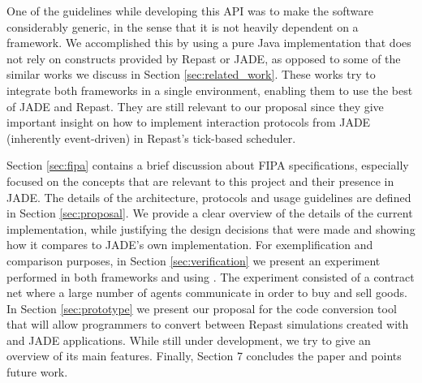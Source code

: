 One of the guidelines while developing this API was to make the software considerably generic, in the sense that it is not heavily dependent on a framework.
We accomplished this by using a pure Java implementation that does not rely on constructs provided by Repast or \gls{JADE}, as opposed to some of the similar works we discuss in Section \ref{sec:related_work}.
These works try to integrate both frameworks in a single environment, enabling them to use the best of \gls{JADE} and Repast. They are still relevant to our proposal since they give important insight on how to implement interaction protocols from \gls{JADE} (inherently event-driven) in Repast's tick-based scheduler.

Section \ref{sec:fipa} contains a brief discussion about FIPA specifications, especially focused on the concepts that are relevant to this project and their presence in JADE.
The details of the architecture, protocols and usage guidelines are defined in Section \ref{sec:proposal}. We provide a clear overview of the details of the current implementation, while justifying the design decisions that were made and showing how it compares to \gls{JADE}'s own implementation.
For exemplification and comparison purposes, in Section \ref{sec:verification} we present an experiment performed in both frameworks and using \apiname{}. The experiment consisted of a contract net where a large number of agents communicate in order to buy and sell goods.
In Section \ref{sec:prototype} we present our proposal for the code conversion tool that will allow programmers to convert between Repast simulations created with \apiname{} and \gls{JADE} applications. While still under development, we try to give an overview of its main features.
Finally, Section 7 concludes the paper and points future work.







